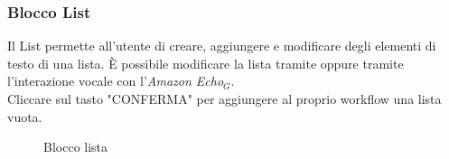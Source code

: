 \subsubsection{Blocco List}
Il List permette all'utente di creare, aggiungere e modificare degli elementi di testo di una lista.
È possibile modificare la lista tramite  oppure tramite l'interazione vocale con l'\textit{Amazon Echo$_{G}$}. \\ 
Cliccare sul tasto "CONFERMA" per aggiungere al proprio workflow una lista vuota.
\begin{figure}[!ht]
	\centering
	\caption{Blocco lista}
\end{figure}
